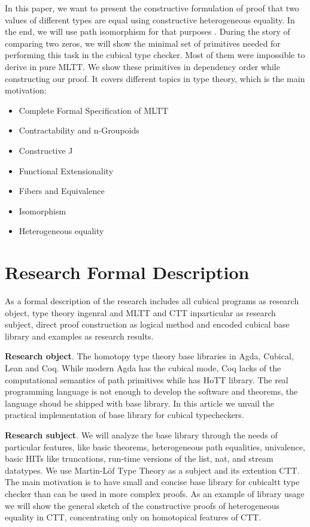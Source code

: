 \documentclass{svproc}
\begin{document}
In this paper, we want to present the constructive formulation of proof
that two values of different types are equal using constructive heterogeneous equality.
In the end, we will use path isomorphism for that purposes \cite{HoTT}.
During the story of comparing two zeros, we will show the minimal set of primitives needed
for performing this task in the cubical type checker. Most of
them were impossible to derive in pure MLTT. We show these primitives in dependency order
while constructing our proof. It covers different topics in type theory, which is the main motivation:

\begin{itemize}
\item Complete Formal Specification of MLTT
\item Contractability and n-Groupoids
\item Constructive J
\item Functional Extensionality
\item Fibers and Equivalence
\item Isomorphism
\item Heterogeneous equality
\end{itemize}

\section{Research Formal Description}

As a formal description of the research includes all cubical programs as research object,
type theory ingenral and MLTT and CTT inparticular as research subject,
direct proof construction as logical method and encoded cubical
base library and examples as research results.

{\bf Research object}. The homotopy type theory base libraries in Agda, Cubical, Lean and Coq.
While modern Agda has the cubical mode, Coq lacks of the computational semantics of path primitives
while has HoTT library. The real programming language is not enough to
develop the software and theorems, the language shoud be shipped with base library. In this article
we unvail the practical implementation of base library for cubical typecheckers.

{\bf Research subject}. We will analyze the base library through the needs of particular features,
like basic theorems, heterogeneous path equalities, univalence, basic HITs like truncations, run-time
versions of the list, nat, and stream datatypes. We use Martin-Löf Type Theory as a subject and
its extention CTT. The main motivation is to have small and concise base library for cubicaltt
type checker than can be used in more complex proofs. As an example of library usage we will show
the general sketch of the constructive proofs of heterogeneous equality in CTT, concentrating only
on homotopical features of CTT.
\end{document}
